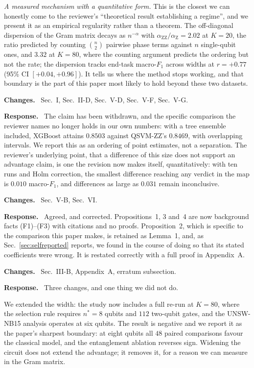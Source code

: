 \documentclass[11pt,a4paper]{article}
\newcommand{\itemhead}[2]{%
  \par\addvspace{15pt}%
  \noindent{\bfseries\color{tagink}#1}\hspace{0.7em}{\bfseries #2}%
  \par\addvspace{3.5pt}%
  \noindent{\color{rulegray}\rule{\linewidth}{0.5pt}}%
  \par\addvspace{5pt}%
  \nobreak}
\newcommand{\resp}{\par\addvspace{2pt}\noindent\textbf{Response.}\ }
\newcommand{\changed}{\par\addvspace{5pt}\noindent
  {\bfseries\color{tagink}Changes.}\ }
\begin{document}
\emph{A measured mechanism with a quantitative form.} This is the closest we can
honestly come to the reviewer's ``theoretical result establishing a regime'',
and we present it as an empirical regularity rather than a theorem. The
off-diagonal dispersion of the Gram matrix decays as $n^{-\alpha}$ with
$\alpha_{\mathrm{ZZ}}/\alpha_{\mathrm{Z}}=2.02$ at $K=20$, the ratio predicted
by counting $\binom{n}{2}$ pairwise phase terms against $n$ single-qubit ones,
and $3.32$ at $K=80$, where the counting argument predicts the ordering but not
the rate; the dispersion tracks end-task macro-$F_1$ across widths at $r=+0.77$
(95\% CI $[+0.04,+0.96]$). It tells us
where the method stops working, and that boundary is the part of this paper most
likely to hold beyond these two datasets.
\changed
Sec.~I, Sec.~II-D, Sec.~V-D, Sec.~V-F, Sec.~V-G.

\itemhead{R3-2}{The advantage rests on a marginal improvement ($0.854$ vs
$0.838$)}
\resp
The claim has been withdrawn, and the specific comparison the reviewer names no
longer holds in our own numbers: with a tree ensemble included, XGBoost attains
$0.8503$ against QSVM-ZZ's $0.8469$, with overlapping intervals. We report this
as an ordering of point estimates, not a separation. The reviewer's underlying
point, that a difference of this size does not support an advantage claim,
is one the revision now makes itself, quantitatively: with ten runs and Holm
correction, the smallest difference reaching any verdict in the map is $0.010$
macro-$F_1$, and differences as large as $0.031$ remain inconclusive.
\changed
Sec.~V-B, Sec.~VI.

\itemhead{R3-3}{The propositions are well-established facts and their framing as
proved propositions is inappropriate}
\resp
Agreed, and corrected. Propositions~1, 3 and~4 are now background facts
(F1)--(F3) with citations and no proofs. Proposition~2, which is specific to the
comparison this paper makes, is retained as Lemma~1, and, as
Sec.~\ref{sec:selfreported} reports, we found in the course of doing so that its
stated coefficients were wrong. It is restated correctly with a full proof in
Appendix~A.
\changed
Sec.~III-B, Appendix~A, erratum subsection.

\itemhead{R3-4}{All experiments use very few qubits and small data, yet are
framed as NISQ-aware}
\resp
Three changes, and one thing we did not do.

We extended the width: the study now includes a full re-run at $K=80$, where the
selection rule requires $n^{\ast}=8$ qubits and $112$ two-qubit gates, and the
UNSW-NB15 analysis operates at six qubits. The result is negative and we report
it as the paper's sharpest boundary: at eight qubits all $48$ paired comparisons
favour the classical model, and the entanglement ablation reverses sign. Widening
the circuit does not extend the advantage; it removes it, for a reason we can
measure in the Gram matrix.
\end{document}
